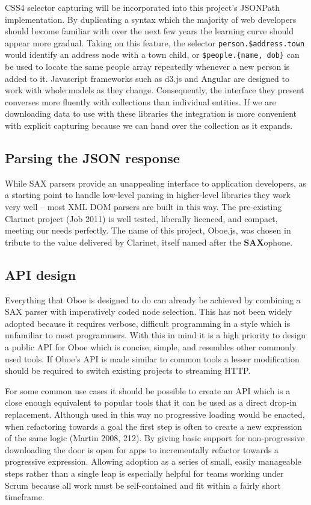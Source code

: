 \documentclass[12pt, ]{article}
\begin{document}
CSS4 selector capturing will be incorporated into this project's
JSONPath implementation. By duplicating a syntax which the majority of
web developers should become familiar with over the next few years the
learning curve should appear more gradual. Taking on this feature, the
selector \texttt{person.\$address.town} would identify an address node
with a town child, or \texttt{\$people.\{name, dob\}} can be used to
locate the same people array repeatedly whenever a new person is added
to it. Javascript frameworks such as d3.js and Angular are designed to
work with whole models as they change. Consequently, the interface they
present converses more fluently with collections than individual
entities. If we are downloading data to use with these libraries the
integration is more convenient with explicit capturing because we can
hand over the collection as it expands.

\subsection{Parsing the JSON response}\label{parsing-the-json-response}

While SAX parsers provide an unappealing interface to application
developers, as a starting point to handle low-level parsing in
higher-level libraries they work very well -- most XML DOM parsers are
built in this way. The pre-existing Clarinet project (Job 2011) is well
tested, liberally licenced, and compact, meeting our needs perfectly.
The name of this project, Oboe.js, was chosen in tribute to the value
delivered by Clarinet, itself named after the \textbf{SAX}ophone.

\subsection{API design}\label{api-design}

Everything that Oboe is designed to do can already be achieved by
combining a SAX parser with imperatively coded node selection. This has
not been widely adopted because it requires verbose, difficult
programming in a style which is unfamiliar to most programmers. With
this in mind it is a high priority to design a public API for Oboe which
is concise, simple, and resembles other commonly used tools. If Oboe's
API is made similar to common tools a lesser modification should be
required to switch existing projects to streaming HTTP.

For some common use cases it should be possible to create an API which
is a close enough equivalent to popular tools that it can be used as a
direct drop-in replacement. Although used in this way no progressive
loading would be enacted, when refactoring towards a goal the first step
is often to create a new expression of the same logic (Martin 2008,
212). By giving basic support for non-progressive downloading the door
is open for apps to incrementally refactor towards a progressive
expression. Allowing adoption as a series of small, easily manageable
steps rather than a single leap is especially helpful for teams working
under Scrum because all work must be self-contained and fit within a
fairly short timeframe.
\end{document}
